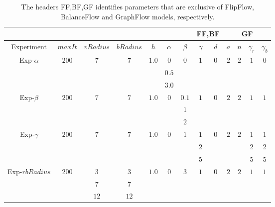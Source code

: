 \begin{table}
\small
\centering
\begin{tabular}{|c|c|c|c|c|c|c|c|c|c|c|c|c|}
\cline{8-13}
\multicolumn{7}{c|}{} & \multicolumn{2}{|c|}{FF,BF} & \multicolumn{4}{|c|}{GF}\\
\hline
Experiment & $maxIt$ & $vRadius$ & $bRadius$ & $h$ & $\alpha$ & $\beta$  & $\gamma$ & $d$ & $a$ & $n$ & $\gamma_r$ & $\gamma_b$ \\
\hline
\multirow{3}{*}{Exp-$\alpha$} & \multirow{3}{*}{$200$} & \multirow{3}{*}{$7$} & \multirow{3}{*}{$7$} & \multirow{3}{*}{$1.0$} & $0$ & \multirow{3}{*}{$0$} & \multirow{3}{*}{$1$} & \multirow{3}{*}{$0$} & \multirow{3}{*}{$2$} & \multirow{3}{*}{$2$} & \multirow{3}{*}{$1$} & \multirow{3}{*}{$0$} \\
&  & & & & $0.5$ & & & & & & &\\
&  & & & & $3.0$ & & & & & & &\\
\hline
\multirow{3}{*}{Exp-$\beta$} & \multirow{3}{*}{$200$} & \multirow{3}{*}{$7$} & \multirow{3}{*}{$7$} & \multirow{3}{*}{$1.0$} & \multirow{3}{*}{$0$} & $0.1$ & \multirow{3}{*}{$1$} & \multirow{3}{*}{$0$} & \multirow{3}{*}{$2$} & \multirow{3}{*}{$2$} & \multirow{3}{*}{$1$} & \multirow{3}{*}{$1$} \\
&  & & & & & $1$ & & & & & &\\
&  & & & & & $2$ & & & & & &\\
\hline
\multirow{3}{*}{Exp-$\gamma$} & \multirow{3}{*}{$200$} & \multirow{3}{*}{$7$} & \multirow{3}{*}{$7$} & \multirow{3}{*}{$1.0$} & \multirow{3}{*}{$0$} & \multirow{3}{*}{$1$} & $1$ & \multirow{3}{*}{$0$} & \multirow{3}{*}{$2$} & \multirow{3}{*}{$2$} & $1$ & $1$ \\
&  & & & & & & $2$ & & & & $2$ & $2$\\
&  & & & & & & $5$ & & & & $5$ & $5$\\
\hline
\multirow{3}{*}{Exp-$rbRadius$} & \multirow{3}{*}{$200$} & $3$ & $3$ & \multirow{3}{*}{$1.0$} &  \multirow{3}{*}{$0$} & \multirow{3}{*}{$3$} & \multirow{3}{*}{$1$} & \multirow{3}{*}{$0$} & \multirow{3}{*}{$2$} & \multirow{3}{*}{$2$} & \multirow{3}{*}{$1$} & \multirow{3}{*}{$1$} \\
&  & $7$ & $7$ & & & & & & & & & \\
&  & $12$ & $12$ & & & & & & & & & \\
\hline
\end{tabular}
\caption{ The headers FF,BF,GF identifies parameters that are exclusive of FlipFlow, BalanceFlow and GraphFlow models, respectively.}
\label{ch9:tab:image-segmentation-parameters-summary}
\end{table}


